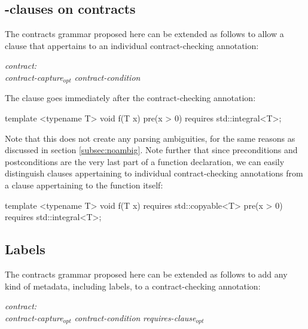 \subsection{-clauses on contracts}
\label{subsec:requires}

The contracts grammar proposed here can be extended as follows to allow a  clause that appertains to an individual contract-checking annotation:

\begin{adjustwidth}{0.5cm}{0.5cm}

\emph{contract:} \\
\phantom{~~~}\emph{contract-capture}$_{opt}$ \emph{contract-condition} 

\end{adjustwidth}

The  clause goes immediately after the contract-checking annotation:

\begin{codeblock}
template <typename T>
void f(T x)
  pre(x > 0) requires std::integral<T>;
\end{codeblock}

Note that this does not create any parsing ambiguities, for the same reasons as discussed in section \ref{subsec:noambig}. Note further that since preconditions and postconditions are the very last part of a function declaration, we can easily distinguish  clauses appertaining to individual contract-checking annotations from a  clause appertaining to the function itself:

\begin{codeblock}
template <typename T>
void f(T x)
  requires std::copyable<T>
  pre(x > 0) requires std::integral<T>;
\end{codeblock}

\subsection{Labels}
\label{subsec:labels}

The contracts grammar proposed here can be extended as follows to add any kind of metadata, including labels, to a contract-checking annotation:

\emph{contract:} \\
\phantom{~~~}\emph{contract-capture}$_{opt}$ \emph{contract-condition}  \emph{requires-clause}$_{opt}$

